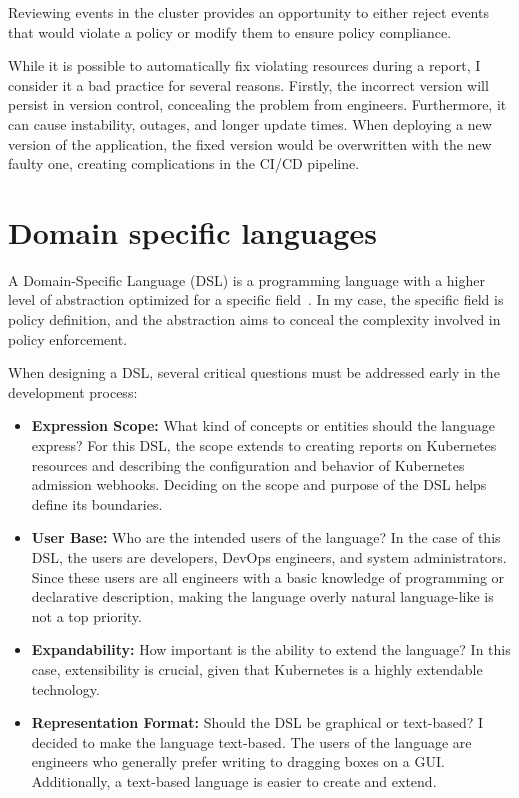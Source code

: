 Reviewing events in the cluster provides an opportunity to either reject events that would violate a policy or modify them to ensure policy compliance.

While it is possible to automatically fix violating resources during a report, I consider it a bad practice for several reasons. Firstly, the incorrect version will persist in version control, concealing the problem from engineers. Furthermore, it can cause instability, outages, and longer update times. When deploying a new version of the application, the fixed version would be overwritten with the new faulty one, creating complications in the CI/CD pipeline.

\section{Domain specific languages}

A Domain-Specific Language (DSL) is a programming language with a higher level of abstraction optimized for a specific field~\cite{JetBrainsDSLs}. In my case, the specific field is policy definition, and the abstraction aims to conceal the complexity involved in policy enforcement.

When designing a DSL, several critical questions must be addressed early in the development process:

\begin{itemize}
    \item \textbf{Expression Scope:} What kind of concepts or entities should the language express? For this DSL, the scope extends to creating reports on Kubernetes resources and describing the configuration and behavior of Kubernetes admission webhooks. Deciding on the scope and purpose of the DSL helps define its boundaries.
    \item \textbf{User Base:} Who are the intended users of the language? In the case of this DSL, the users are developers, DevOps engineers, and system administrators. Since these users are all engineers with a basic knowledge of programming or declarative description, making the language overly natural language-like is not a top priority.
    \item \textbf{Expandability:} How important is the ability to extend the language? In this case, extensibility is crucial, given that Kubernetes is a highly extendable technology.
    \item \textbf{Representation Format:} Should the DSL be graphical or text-based? I decided to make the language text-based. The users of the language are engineers who generally prefer writing to dragging boxes on a GUI. Additionally, a text-based language is easier to create and extend.
\end{itemize}

